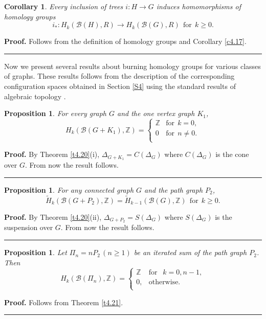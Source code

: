 \documentclass[a4paper, 11pt]{article}
\newtheorem{proposition}[theorem]{Proposition}
\newtheorem{corollary}[theorem]{Corollary}
\newenvironment{proof}[1][Proof]{\textbf{#1.} }{\ \rule{0.5em}{0.5em}}
\begin{document}
\begin{corollary}\label{c5.3}   Every inclusion of trees $i\colon H\to  G$  induces   
homomorphisms of
homology groups  
\begin{equation}\label{5.2}
i_*\colon H_k(\mathcal B(H), R)\to H_k(\mathcal B(G), R) \ \ \text{for} \ \ k\geq 0.
\end{equation} 
\end{corollary} 
\begin{proof} Follows from  the definition of homology groups and Corollary \ref{c4.17}. 
\end{proof} 

Now we present several results about burning homology groups for various classes of graphs.  These results  follows from the description of the corresponding configuration spaces obtained in Section \ref{S4} using the standard results of algebraic topology \cite{Dold, Hatcher, Hilton, MacLane,  May, Munkres, Prasolov}. 

\begin{proposition}\label{p5.4} For every graph $G$ and the one vertex graph $K_1$, 
$$
H_k(\mathcal B(G+K_1), \mathbb Z)=
\begin{cases} 
\mathbb Z& \text{for}  \ \  k=0, \\
                                                             0& \text{for} \ \ n\ne 0. \\
\end{cases}
$$ 
\end{proposition}
\begin{proof} By Theorem \ref{t4.20}(i), $\Delta_{G+K_1}=C(\Delta_G)$ where 
$C(\Delta_G)$  is the cone over $G$.  From now the result follows. 
\end{proof}



\begin{proposition}\label{p5.5} For any connected graph $G$ and the path  graph $P_2$, 
$$
\widetilde H_k(\mathcal B(G+P_2), \mathbb Z)=\widetilde H_{k-1}(\mathcal B(G), \mathbb Z)\ \  \text{for} \ \ k\geq 0.  
$$ 
\end{proposition}
\begin{proof}  By Theorem \ref{t4.20}(ii), $\Delta_{G+P_2}=S(\Delta_G)$ where 
$S(\Delta_G)$  is the suspension over $G$.  From now the result follows. 
\end{proof}

\begin{proposition}\label{p5.6}  Let $\Pi_n=nP_2\, (n\geq 1)$ be an iterated sum of the path graph $P_2$. Then 
$$
H_k(\mathcal B(\Pi_n), \mathbb Z)=\begin{cases} \mathbb Z & \text{for } \ \  k=0, n-1,\\
0, & \text{otherwise}.\\
\end{cases}
$$
\end{proposition}
\begin{proof} Follows from Theorem \ref{t4.21}. 
\end{proof}
\end{document}

